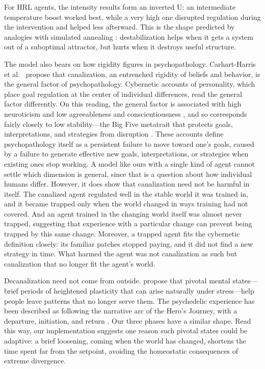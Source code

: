 \documentclass[12pt,fleqn]{article}
\begin{document}
For HRL agents, the intensity results form an inverted U: an intermediate temperature boost worked best, while a very high one disrupted regulation during the intervention and helped less afterward. This is the shape predicted by analogies with simulated annealing \citep{kirkpatrick_optimization_1983, hajek_cooling_1988}: destabilization helps when it gets a system out of a suboptimal attractor, but hurts when it destroys useful structure. 


The model also bears on how rigidity figures in psychopathology. Carhart-Harris et al.\ \citeyearpar{carhart-harris_canalization_2023} propose that canalization, an entrenched rigidity of beliefs and behavior, is the general factor of psychopathology. Cybernetic accounts of personality, which place goal regulation at the center of individual differences, read the general factor differently. On this reading, the general factor is associated with high neuroticism and low agreeableness and conscientiousness \citep{caspi_p_2014}, and so corresponds fairly closely to low stability---the Big Five metatrait that protects goals, interpretations, and strategies from disruption \citep{safron_deyoung_2021}. These accounts define psychopathology itself as a persistent failure to move toward one's goals, caused by a failure to generate effective new goals, interpretations, or strategies when existing ones stop working. A model like ours with a single kind of agent cannot settle which dimension is general, since that is a question about how individual humans differ. However, it does show that canalization need not be harmful in itself. The canalized agent regulated well in the stable world it was trained in, and it became trapped only when the world changed in ways training had not covered. And an agent trained in the changing world itself was almost never trapped, suggesting that experience with a particular change can prevent being trapped by this same change. Moreover, a trapped agent fits the cybernetic definition closely: its familiar patches stopped paying, and it did not find a new strategy in time. What harmed the agent was not canalization as such but canalization that no longer fit the agent's world.

Decanalization need not come from outside. \citet{brouwer_pivotal_2021} propose that pivotal mental states---brief periods of heightened plasticity that can arise naturally under stress---help people leave patterns that no longer serve them. The psychedelic experience has been described as following the narrative arc of the Hero's Journey, with a departure, initiation, and return \citep{brouwer_trajectory_2024}. Our three phases have a similar shape. Read this way, our implementation suggests one reason such pivotal states could be adaptive: a brief loosening, coming when the world has changed, shortens the time spent far from the setpoint, avoiding the homeostatic consequences of extreme divergence.
\end{document}
